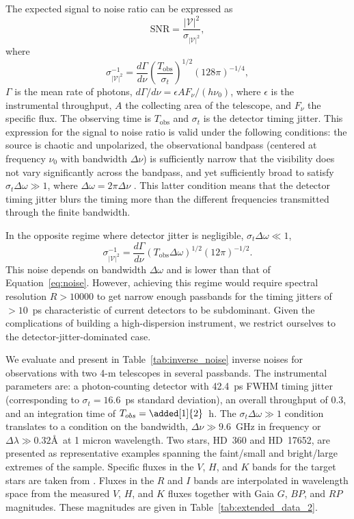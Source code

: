 \documentclass[linenumbers,trackchanges]{aastex701}
\begin{document}
The expected signal to noise ratio can be expressed as
\begin{equation}
    \text{SNR} = \frac{|\mathcal{V}|^2}{\sigma_{|\mathcal{V}|^2}},
\end{equation}
where 
\begin{equation}
\sigma^{-1}_{|\mathcal{V}|^2} =\frac{d\Gamma}{d\nu}
\left(
\frac{T_{\text{obs}}}{\sigma_t}
\right)^{1/2} 
\left(128 \pi\right)^{-1/4}, \label{eq:noise}
\end{equation}
$\Gamma$ is the mean rate of photons, $d\Gamma/d\nu= \epsilon AF_\nu/(h\nu_0)$, where $\epsilon$ is the instrumental throughput,
$A$ the collecting area of the telescope, and $F_\nu$ the specific flux.  The observing time is $T_{\text{obs}}$ and $\sigma_t$
is the detector timing jitter.
This expression for the signal to noise ratio is valid under the following conditions: the source is chaotic and unpolarized, the observational bandpass (centered at frequency $\nu_0$ with bandwidth $\Delta \nu$) is sufficiently narrow that the visibility does not vary significantly across the bandpass, and yet sufficiently broad to satisfy $\sigma_t \Delta \omega \gg 1$, where $\Delta \omega = 2\pi\Delta\nu$
\citep{2024PhRvD.109l3029D}.
This latter condition means that the detector timing jitter blurs
the timing more than the different frequencies transmitted through the finite bandwidth.

In the opposite regime where detector jitter is negligible, $\sigma_t \Delta \omega \ll 1$, 
\begin{equation}
\sigma^{-1}_{|\mathcal{V}|^2} = \frac{d\Gamma}{d\nu} \left(T_{\text{obs}} \Delta \omega\right)^{1/2}  \left(12 \pi \right)^{-1/2}.
\end{equation}
This noise depends on bandwidth $\Delta \omega$ and is lower than that of Equation~\ref{eq:noise}. However, achieving this regime would require spectral resolution $R>10000$ to get narrow enough passbands for the timing jitters of $>10$~ps characteristic of current detectors to be subdominant.  Given the complications of building a high-dispersion instrument, we restrict ourselves to the detector-jitter-dominated case.

We evaluate and present in Table~\ref{tab:inverse_noise} inverse noises for observations with two
4-m telescopes in several passbands.
The instrumental parameters are: a photon-counting detector with 42.4~ps FWHM timing jitter
\cite{10.1117/1.JATIS.11.3.035005} (corresponding to $\sigma_t=16.6$~ps standard deviation),
an overall throughput of 0.3, and an integration time of $T_{obs}=\added[1]{2}$~h.
The $\sigma_t \Delta \omega \gg 1$ condition translates to a condition on the bandwidth,
$\Delta \nu \gg 9.6$~GHz in frequency or $\Delta \lambda \gg 0.32$\AA\ at 1 micron wavelength.
Two stars, HD~360 and HD~17652, are presented as representative examples spanning the faint/small and bright/large extremes of the sample. 
Specific fluxes in the $V$, $H$, and $K$ bands for the target stars are taken from \citet{2018A&A...616A..68G, 2019Natur.567..200P}. Fluxes in the $R$ and $I$ bands are interpolated in wavelength space from the measured $V$, $H$, and $K$ fluxes together with Gaia $G$, $BP$, and $RP$ magnitudes.  These magnitudes are given 
in Table~\ref{tab:extended_data_2}.
\end{document}
